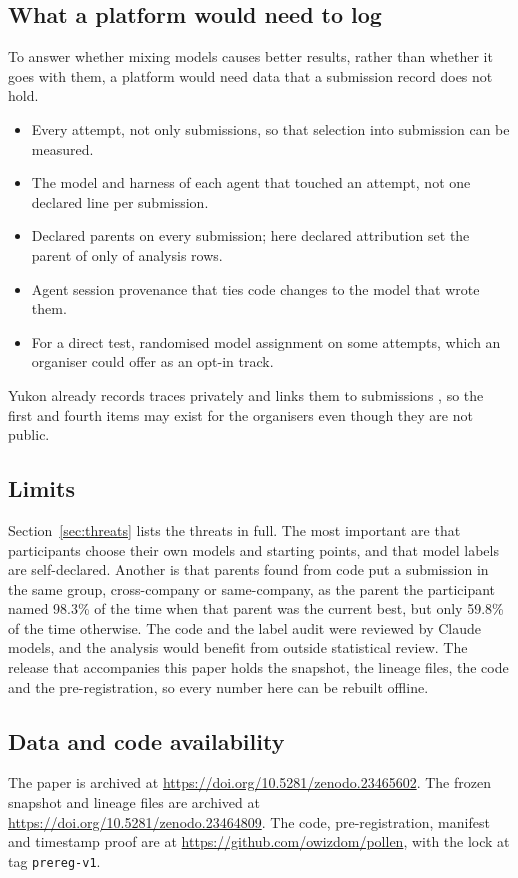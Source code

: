 \subsection{What a platform would need to log}

To answer whether mixing models causes better results, rather than whether it goes with them, a platform would need data that a submission record does not hold.
\begin{itemize}
  \item Every attempt, not only submissions, so that selection into submission can be measured.
  \item The model and harness of each agent that touched an attempt, not one declared line per submission.
  \item Declared parents on every submission; here declared attribution set the parent of only \DeclaredShare{} of analysis rows.
  \item Agent session provenance that ties code changes to the model that wrote them.
  \item For a direct test, randomised model assignment on some attempts, which an organiser could offer as an opt-in track.
\end{itemize}
Yukon already records traces privately and links them to submissions \citep{yukoncli2026}, so the first and fourth items may exist for the organisers even though they are not public.

\subsection{Limits}

Section~\ref{sec:threats} lists the threats in full.
The most important are that participants choose their own models and starting points, and that model labels are self-declared.
Another is that parents found from code put a submission in the same group, cross-company or same-company, as the parent the participant named 98.3\% of the time when that parent was the current best, but only 59.8\% of the time otherwise.
The code and the label audit were reviewed by Claude models, and the analysis would benefit from outside statistical review.
The release that accompanies this paper holds the snapshot, the lineage files, the code and the pre-registration, so every number here can be rebuilt offline.

\subsection*{Data and code availability}
The paper is archived at \url{https://doi.org/10.5281/zenodo.23465602}.
The frozen snapshot and lineage files are archived at \url{https://doi.org/10.5281/zenodo.23464809}.
The code, pre-registration, manifest and timestamp proof are at \url{https://github.com/owizdom/pollen}, with the lock at tag \texttt{prereg-v1}.
